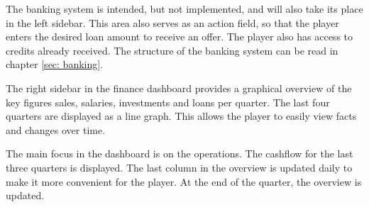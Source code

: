 The banking system is intended, but not implemented, and will also take its place in the left sidebar. This area also serves as an action field, so that the player enters the desired loan amount to receive an offer. The player also has access to credits already received. The structure of the banking system can be read in chapter \ref{sec: banking}. 

The right sidebar in the finance dashboard provides a graphical overview of the key figures sales, salaries, investments and loans per quarter. The last four quarters are displayed as a line graph. This allows the player to easily view facts and changes over time. 

The main focus in the dashboard is on the operations. The cashflow for the last three quarters is displayed. The last column in the overview is updated daily to make it more convenient for the player. At the end of the quarter, the overview is updated. 
